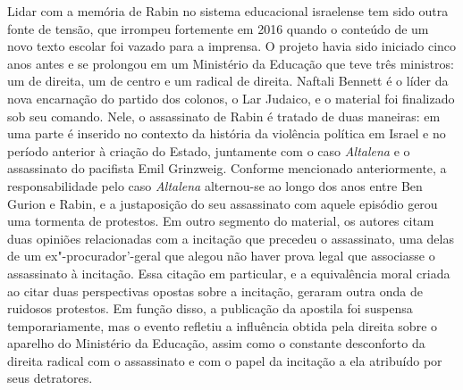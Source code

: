 Lidar com a memória de Rabin no sistema educacional israelense tem sido
outra fonte de tensão, que irrompeu fortemente em 2016 quando o conteúdo
de um novo texto escolar foi vazado para a imprensa. O projeto havia
sido iniciado cinco anos antes e se prolongou em um Ministério da
Educação que teve três ministros: um de direita, um de centro e um
radical de direita. Naftali Bennett é o líder da nova encarnação do
partido dos colonos, o Lar Judaico, e o material foi finalizado sob seu
comando. Nele, o assassinato de Rabin é tratado de duas maneiras: em uma
parte é inserido no contexto da história da violência política em Israel
e no período anterior à criação do Estado, juntamente com o caso
\emph{Altalena} e o assassinato do pacifista Emil Grinzweig. Conforme
mencionado anteriormente, a responsabilidade pelo caso \emph{Altalena}
alternou-se ao longo dos anos entre Ben Gurion e Rabin, e a justaposição
do seu assassinato com aquele episódio gerou uma tormenta de protestos.
Em outro segmento do material, os autores citam duas opiniões
relacionadas com a incitação que precedeu o assassinato, uma delas de
um ex"-procurador'-geral que alegou não haver prova legal que associasse o
assassinato à incitação. Essa citação em particular, e a equivalência
moral criada ao citar duas perspectivas opostas sobre a incitação,
geraram outra onda de ruidosos protestos. Em função disso, a publicação
da apostila foi suspensa temporariamente, mas o evento refletiu a
influência obtida pela direita sobre o aparelho do Ministério da
Educação, assim como o constante desconforto da direita radical com o
assassinato e com o papel da incitação a ela atribuído por seus
detratores.


